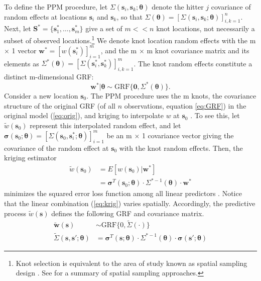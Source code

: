 To define the PPM procedure, let $\Sigma(\pmb{s}_{i}, \pmb{s}_{k}; \pmb{\theta})$ denote the hitter $j$ covariance of random effects at locations $\pmb{s}_{i}$ and $\pmb{s}_{k}$, so that $\Sigma(\pmb{\theta}) = [\Sigma(\pmb{s}_{i}, \pmb{s}_{k}; \pmb{\theta})]_{i,k=1}^{n}$. Next, let $\pmb{S}^{*} = \{\pmb{s}_{1}^{*}, \dots, \pmb{s}_{m}^{*}\}$ give a set of $m << n$ knot locations, not necessarily a subset of observed locations.\footnote{Knot selection is equivalent to the area of study known as spatial sampling design \citep{Finley2009}. See \citep{Xia2006} for a summary of spatial sampling approaches.} We denote knot location random effects with the m $\times$ 1 vector $\pmb{w}^{*} = \left[w(\pmb{s}_{i}^{*})\right]_{i=1}^{m}$, and the m $\times$ m knot covariance matrix and its elements as $\Sigma^{*}(\pmb{\theta}) = \left[\Sigma(\pmb{s}_{i}^{*}, \pmb{s}_{k}^{*})\right]_{i,k = 1}^{m}$. The knot random effects constitute a distinct m-dimensional GRF:
\begin{equation}
\pmb{w}^{*}|\pmb{\theta} \sim \text{GRF}\{\pmb{0}, \Sigma^{*}(\pmb{\theta})\}.
\end{equation}
Consider a new location $\pmb{s}_{0}$. The PPM procedure uses the m knots, the covariance structure of the original GRF (of all $n$ observations, equation \ref{eq:GRF}) in the original model (\ref{eq:orig}), and kriging to interpolate $w$ at $\pmb{s}_{0}$ \citep{Schabenberger2004}. To see this, let $\widetilde{w}(\pmb{s}_{0})$ represent this interpolated random effect, and let $\pmb{\sigma}(\pmb{s}_{0};\pmb{\theta}) = \left[\Sigma(\pmb{s}_{0}, \pmb{s}_{i}^{*}; \pmb{\theta})\right]_{i = 1}^{m}$ be an m $\times$ 1 covariance vector giving the covariance of the random effect at $\pmb{s}_{0}$ with the knot random effects. Then, the kriging estimator
\begin{align}
\widetilde{w}(\pmb{s}_{0}) &= E[w(\pmb{s}_{0})|\pmb{w}^{*}] \\ 
&= \pmb{\sigma}^{T}(\pmb{s}_{0};\pmb{\theta}) \cdot \Sigma^{*-1}(\pmb{\theta}) \cdot \pmb{w}^{*} \label{eq:krig}
\end{align}
minimizes the squared error loss function among all linear predictors \citep{Schabenberger2004}. Notice that the linear combination (\ref{eq:krig}) varies spatially. Accordingly, the predictive process $\widetilde{w}(\pmb{s})$ defines the following GRF and covariance matrix.
\begin{align}
\widetilde{\pmb{w}}(\pmb{s}) &\sim \text{GRF}\{0, \widetilde{\Sigma}(\cdot)\} \\
\widetilde{\Sigma}(\pmb{s}, \pmb{s}'; \pmb{\theta}) &= \pmb{\sigma}^{T}(\pmb{s};\pmb{\theta}) \cdot \Sigma^{*-1}(\pmb{\theta}) \cdot \pmb{\sigma}(\pmb{s}';\pmb{\theta})
\end{align}
